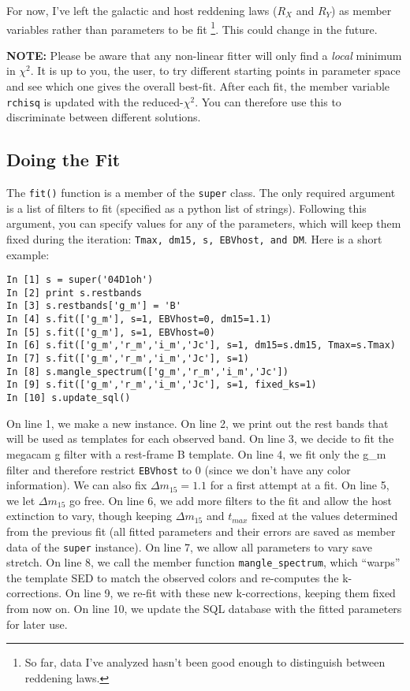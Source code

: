 \documentclass[12pt]{article}
\begin{document}
For now, I've left the galactic and host reddening laws ($R_{X}$
and $R_{Y}$) as member variables rather than parameters to be fit%
\footnote{So far, data I've analyzed hasn't been good enough to distinguish
between reddening laws.%
}. This could change in the future.

\textbf{NOTE:} Please be aware that any non-linear fitter will only
find a \emph{local} minimum in $\chi^{2}$. It is up to you, the user,
to try different starting points in parameter space and see which
one gives the overall best-fit. After each fit, the member variable
\texttt{rchisq} is updated with the reduced-$\chi^{2}$. You can therefore
use this to discriminate between different solutions.


\subsection{Doing the Fit}

The \texttt{fit()} function is a member of the \texttt{super} class.
The only required argument is a list of filters to fit (specified
as a python list of strings). Following this argument, you can specify
values for any of the parameters, which will keep them fixed during
the iteration: \texttt{Tmax, dm15, s, EBVhost, and DM}. Here is a
short example:

\begin{verbatim}
In [1] s = super('04D1oh')
In [2] print s.restbands
In [3] s.restbands['g_m'] = 'B'
In [4] s.fit(['g_m'], s=1, EBVhost=0, dm15=1.1)
In [5] s.fit(['g_m'], s=1, EBVhost=0)
In [6] s.fit(['g_m','r_m','i_m','Jc'], s=1, dm15=s.dm15, Tmax=s.Tmax)
In [7] s.fit(['g_m','r_m','i_m','Jc'], s=1)
In [8] s.mangle_spectrum(['g_m','r_m','i_m','Jc'])
In [9] s.fit(['g_m','r_m','i_m','Jc'], s=1, fixed_ks=1)
In [10] s.update_sql()
\end{verbatim}

On line 1, we make a new instance. On line 2, we print out the rest
bands that will be used as templates for each observed band. On line
3, we decide to fit the megacam g filter with a rest-frame B template.
On line 4, we fit only the g\_m filter and therefore restrict \texttt{EBVhost}
to 0 (since we don't have any color information). We can also fix
$\Delta m_{15}=1.1$ for a first attempt at a fit. On line 5, we let
$\Delta m_{15}$ go free. On line 6, we add more filters to the fit
and allow the host extinction to vary, though keeping $\Delta m_{15}$
and $t_{max}$ fixed at the values determined from the previous fit
(all fitted parameters and their errors are saved as member data of
the \texttt{super} instance). On line 7, we allow all parameters to
vary save stretch. On line 8, we call the member function \texttt{mangle\_spectrum},
which {}``warps'' the template SED to match the observed colors
and re-computes the k-corrections. On line 9, we re-fit with these
new k-corrections, keeping them fixed from now on. On line 10, we
update the SQL database with the fitted parameters for later use.
\end{document}
